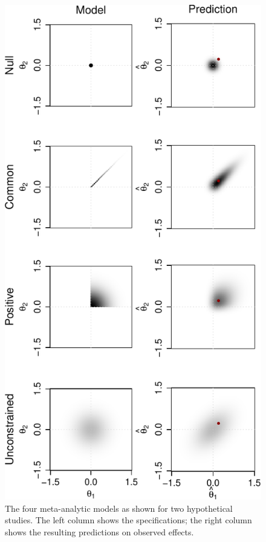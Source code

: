 \documentclass[english,man]{apa6}
\theoremstyle{definition}
\theoremstyle{definition}
\theoremstyle{definition}
\theoremstyle{remark}
\begin{document}
\begin{figure}[htbp]
\centering
\includegraphics{p_files/figure-latex/pred-1.pdf}
\caption{\label{fig:pred}The four meta-analytic models as shown for two
hypothetical studies. The left column shows the specifications; the
right column shows the resulting predictions on observed effects.}
\end{figure}
\end{document}
